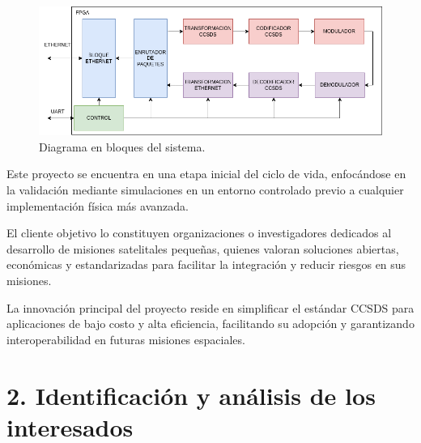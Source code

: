 \documentclass[
11pt, %
]{charter}
\begin{document}
\begin{figure}[htpb]
\centering 
\includegraphics[width=1\textwidth]{./Figuras/TESIS_GONZALO.drawio.png}
\caption{Diagrama en bloques del sistema.}
\label{fig:diagBloques}
\end{figure}



Este proyecto se encuentra en una etapa inicial del ciclo de vida, enfocándose en la validación mediante simulaciones en un entorno controlado previo a cualquier implementación física más avanzada.

El cliente objetivo lo constituyen organizaciones o investigadores dedicados al desarrollo de misiones satelitales pequeñas, quienes valoran soluciones abiertas, económicas y estandarizadas para facilitar la integración y reducir riesgos en sus misiones.

La innovación principal del proyecto reside en simplificar el estándar CCSDS para aplicaciones de bajo costo y alta eficiencia, facilitando su adopción y garantizando interoperabilidad en futuras misiones espaciales.

\section{2. Identificación y análisis de los interesados}
\label{sec:interesados}
\end{document}
